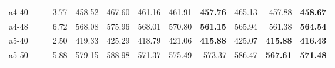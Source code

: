 \documentclass[aspectratio=1610]{beamer}
\begin{document}
\begin{frame}
\begin{table}[]
{\begin{tabular}{lrrrrrrrrrrr}
a4-40                                          &              & \multicolumn{1}{r|}{}                                       & 3.77              & 458.52          & \multicolumn{1}{r|}{467.60}                                 & 461.16          & \multicolumn{1}{r|}{461.91}   & \textbf{457.76} & \multicolumn{1}{r|}{465.13}                                 & 457.88          & {\color[HTML]{FE0000} \textbf{458.67}} \\
a4-48                                          &              & \multicolumn{1}{r|}{}                                       & 6.72              & 568.08          & \multicolumn{1}{r|}{575.96}                                 & 568.01          & \multicolumn{1}{r|}{570.80}   & \textbf{561.15} & \multicolumn{1}{r|}{565.94}                                 & 561.38          & {\color[HTML]{FE0000} \textbf{564.54}} \\
a5-40                                          &              & \multicolumn{1}{r|}{}                                       & 2.50              & 419.33          & \multicolumn{1}{r|}{425.29}                                 & 418.79          & \multicolumn{1}{r|}{421.06}   & \textbf{415.88} & \multicolumn{1}{r|}{425.07}                                 & \textbf{415.88} & {\color[HTML]{FE0000} \textbf{416.43}} \\
a5-50                                          &              & \multicolumn{1}{r|}{}                                       & 5.88              & 579.15          & \multicolumn{1}{r|}{588.98}                                 & 571.37          & \multicolumn{1}{r|}{575.49}   & 573.37          & \multicolumn{1}{r|}{586.47}                                 & \textbf{567.61} & {\color[HTML]{FE0000} \textbf{571.48}} \\ \hline
\end{tabular}%
}
\end{table}

\end{frame}
\end{document}
